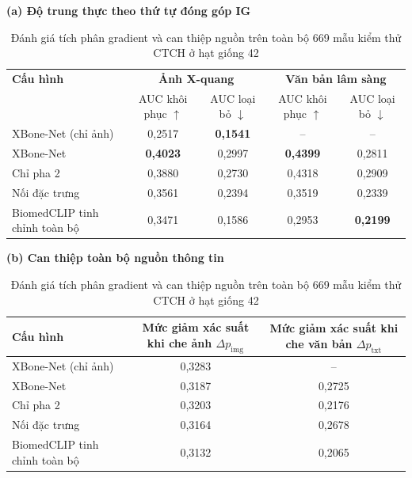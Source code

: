 \begin{table}[H]
\centering
\small
\setlength{\tabcolsep}{4pt}
\renewcommand{\arraystretch}{1.15}
\textbf{(a) Độ trung thực theo thứ tự đóng góp IG}\par\smallskip
\begin{tabularx}{\textwidth}{|X|c|c|c|c|}
\hline
\textbf{Cấu hình} & \multicolumn{2}{c|}{\textbf{Ảnh X-quang}} & \multicolumn{2}{c|}{\textbf{Văn bản lâm sàng}} \\ \cline{2-5}
 & \makecell{AUC khôi\\phục $\uparrow$} & \makecell{AUC loại\\bỏ $\downarrow$} & \makecell{AUC khôi\\phục $\uparrow$} & \makecell{AUC loại\\bỏ $\downarrow$} \\ \hline
XBone-Net (chỉ ảnh) & 0,2517 & \textbf{0,1541} & -- & -- \\ \hline
\rowcolor{gray!30}XBone-Net & \textbf{0,4023} & 0,2997 & \textbf{0,4399} & 0,2811 \\ \hline
Chỉ pha 2 & 0,3880 & 0,2730 & 0,4318 & 0,2909 \\ \hline
Nối đặc trưng & 0,3561 & 0,2394 & 0,3519 & 0,2339 \\ \hline
BiomedCLIP tinh chỉnh toàn bộ & 0,3471 & 0,1586 & 0,2953 & \textbf{0,2199} \\ \hline
\end{tabularx}
\medskip

\textbf{(b) Can thiệp toàn bộ nguồn thông tin}\par\smallskip
\begin{tabularx}{\textwidth}{|X|c|c|}
\hline
\textbf{Cấu hình} & \makecell{Mức giảm xác suất\\khi che ảnh $\Delta p_{\mathrm{img}}$} & \makecell{Mức giảm xác suất\\khi che văn bản $\Delta p_{\mathrm{txt}}$} \\ \hline
XBone-Net (chỉ ảnh) & 0,3283 & -- \\ \hline
\rowcolor{gray!30}XBone-Net & 0,3187 & 0,2725 \\ \hline
Chỉ pha 2 & 0,3203 & 0,2176 \\ \hline
Nối đặc trưng & 0,3164 & 0,2678 \\ \hline
BiomedCLIP tinh chỉnh toàn bộ & 0,3132 & 0,2065 \\ \hline
\end{tabularx}
\caption{Đánh giá tích phân gradient và can thiệp nguồn trên toàn bộ 669 mẫu kiểm thử CTCH ở hạt giống 42}
\label{tab:ablation_explainability}
\end{table}
